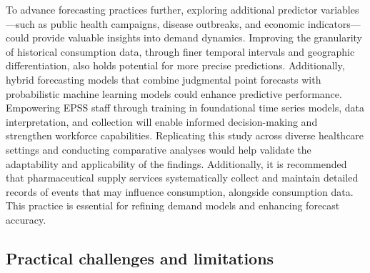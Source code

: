 \documentclass[
  authoryear,
  preprint,
  3p]{elsarticle}
\begin{document}
To advance forecasting practices further, exploring additional predictor
variables---such as public health campaigns, disease outbreaks, and
economic indicators---could provide valuable insights into demand
dynamics. Improving the granularity of historical consumption data,
through finer temporal intervals and geographic differentiation, also
holds potential for more precise predictions. Additionally, hybrid
forecasting models that combine judgmental point forecasts with
probabilistic machine learning models could enhance predictive
performance. Empowering EPSS staff through training in foundational time
series models, data interpretation, and collection will enable informed
decision-making and strengthen workforce capabilities. Replicating this
study across diverse healthcare settings and conducting comparative
analyses would help validate the adaptability and applicability of the
findings. Additionally, it is recommended that pharmaceutical supply
services systematically collect and maintain detailed records of events
that may influence consumption, alongside consumption data. This
practice is essential for refining demand models and enhancing forecast
accuracy.

\subsection{Practical challenges and
limitations}\label{practical-challenges-and-limitations}
\end{document}
